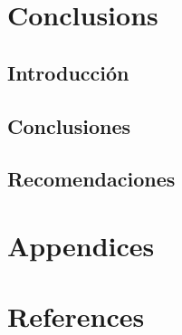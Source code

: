 \documentclass[
  english]{revcoles}
\begin{document}
\section{Conclusions}

\subsection{Introducción}

\subsection{Conclusiones}

\subsection{Recomendaciones}

\section{Appendices}

\section*{References}
\end{document}
